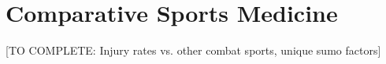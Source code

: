 \section{Comparative Sports Medicine}

[TO COMPLETE: Injury rates vs. other combat sports, unique sumo factors]